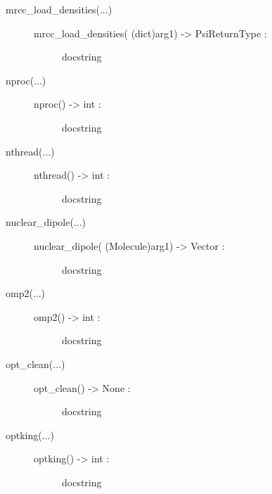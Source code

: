 \documentclass[letterpaper,10pt,english]{sphinxmanual}
\begin{document}
\begin{description}
\begin{description}
\begin{description}
\end{description}

\item[{mrcc\_load\_densities(...)}] \leavevmode\begin{description}
\item[{mrcc\_load\_densities( (dict)arg1) -\textgreater{} PsiReturnType :}] \leavevmode
docstring

\end{description}

\item[{nproc(...)}] \leavevmode\begin{description}
\item[{nproc() -\textgreater{} int :}] \leavevmode
docstring

\end{description}

\item[{nthread(...)}] \leavevmode\begin{description}
\item[{nthread() -\textgreater{} int :}] \leavevmode
docstring

\end{description}

\item[{nuclear\_dipole(...)}] \leavevmode\begin{description}
\item[{nuclear\_dipole( (Molecule)arg1) -\textgreater{} Vector :}] \leavevmode
docstring

\end{description}

\item[{omp2(...)}] \leavevmode\begin{description}
\item[{omp2() -\textgreater{} int :}] \leavevmode
docstring

\end{description}

\item[{opt\_clean(...)}] \leavevmode\begin{description}
\item[{opt\_clean() -\textgreater{} None :}] \leavevmode
docstring

\end{description}

\item[{optking(...)}] \leavevmode\begin{description}
\item[{optking() -\textgreater{} int :}] \leavevmode
docstring


\end{description}
\end{description}
\end{description}
\end{document}
